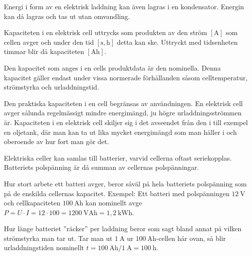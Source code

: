 Energi i form av en elektrisk laddning kan även lagras i en kondensator.
Energin kan då lagras och tas ut utan omvandling.

Kapaciteten i en elektrisk cell uttrycks som produkten av den ström
\(\mathrm{[A]}\) som cellen avger och under den tid \(\mathrm{[s, h]}\) detta
kan ske.
Uttryckt med tidsenheten timmar blir då kapaciteten \(\mathrm{[Ah]}\).

Den kapacitet som anges i en cells produktdata är den nominella.
Denna kapacitet gäller endast under vissa normerade förhållanden såsom
celltemperatur, strömstyrka och urladdningstid.

Den praktiska kapaciteten i en cell begränsas av användningen.
En elektrisk cell avger sålunda regelmässigt mindre energimängd, ju högre
urladdningsströmmen är.
Kapaciteten i en elektrisk cell skiljer sig i det avseendet från den i
till exempel en oljetank, där man kan ta ut lika mycket energimängd som man häller i
och oberoende av hur fort man gör det.

Elektriska celler kan samlas till batterier, varvid cellerna oftast
seriekopplas.
Batteriets polspänning är då summan av cellernas pols\-pänningar.

Hur stort arbete ett batteri avger, beror såväl på hela batteriets
polspänning som på de enskilda cellernas kapacitet.
Exempel:
Ett batteri med polspänningen \(12\ \mathrm{V}\) och cellkapaciteten
\(100\ \mathrm{Ah}\) kan nominellt avge
\(P = U \cdot I = 12 \cdot 100 = 1200\ \mathrm{VAh} = 1,2\ \mathrm{kWh}\).

Hur länge batteriet ''räcker'' per laddning beror som sagt bland annat på
vilken strömstyrka man tar ut.
Tar man ut \(1\ \mathrm{A}\) ur \(100\ \mathrm{Ah}\)-cellen här ovan, så blir
urladdningstiden nominellt
\(t = 100\ \mathrm{Ah}/1\ \mathrm{A} = 100\ \mathrm{h}\).
